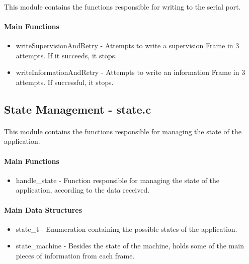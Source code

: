 \documentclass[11pt]{article}
\begin{document}
\paragraph{}This module contains the functions responsible for writing to the serial port.

\paragraph{Main Functions}

\begin{itemize}
  \item{writeSupervisionAndRetry - Attempts to write a supervision Frame in 3 attempts. If it succeeds, it stops.}
  \item{writeInformationAndRetry - Attempts to write an information Frame in 3 attempts. If successful, it stops.}
\end{itemize}

\subsection{State Management - state.c}

\paragraph{}This module contains the functions responsible for managing the state of the application.

\paragraph{Main Functions}

\begin{itemize}
  \item{handle\_state - Function responsible for managing the state of the application, according to the data received.}
\end{itemize}

\paragraph{Main Data Structures}

\begin{itemize}
        \item{state\_t - Enumeration containing the possible states of the application.}
  \item{state\_machine - Besides the state of the machine, holds some of the main pieces of
        information from each frame.}
\end{itemize}
\end{document}
